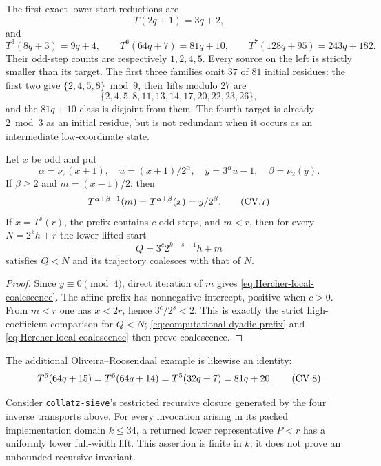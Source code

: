 The first exact lower-start reductions are
\[
 T(2q+1)=3q+2,
\]
and
\begin{equation}
\label{eq:computational-four-transports}
 T^3(8q+3)=9q+4,\qquad
 T^6(64q+7)=81q+10,\qquad
 T^7(128q+95)=243q+182.
\end{equation}
Their odd-step counts are respectively $1,2,4,5$.  Every source on the left
is strictly smaller than its target.  The first three families omit $37$ of
$81$ initial residues: the first two give
$\{2,4,5,8\}\bmod9$, their lifts modulo $27$ are
\[
 \{2,4,5,8,11,13,14,17,20,22,23,26\},
\]
and the $81q+10$ class is disjoint from them.  The fourth target is already
$2\bmod3$ as an initial residue, but is not redundant when it occurs as an
intermediate low-coordinate state.

\begin{proposition}
\label{prop:Hercher-computational-coalescence}
Let $x$ be odd and put
\[
 \alpha=\nu_2(x+1),\quad u=(x+1)/2^\alpha,
 \quad y=3^\alpha u-1,\quad\beta=\nu_2(y).
\]
If $\beta\geq2$ and $m=(x-1)/2$, then
\begin{equation}
\stepcounter{equation}
\label{eq:Hercher-local-coalescence}
 T^{\alpha+\beta-1}(m)=T^{\alpha+\beta}(x)=y/2^\beta.
\tag{CV.7}
\end{equation}
If $x=T^s(r)$, the prefix contains $c$ odd steps, and $m<r$, then for every
$N=2^kh+r$ the lower lifted start
\[
 Q=3^c2^{k-s-1}h+m
\]
satisfies $Q<N$ and its trajectory coalesces with that of $N$.
\end{proposition}

\begin{proof}
Since $y\equiv0\pmod4$, direct iteration of $m$ gives
\eqref{eq:Hercher-local-coalescence}.  The affine prefix has nonnegative
intercept, positive when $c>0$.  From $m<r$ one has $x<2r$, hence
$3^c/2^s<2$.  This is exactly the strict high-coefficient comparison for
$Q<N$; \eqref{eq:computational-dyadic-prefix} and
\eqref{eq:Hercher-local-coalescence} then prove coalescence.
\end{proof}

The additional Oliveira--Roosendaal example is likewise an identity:
\begin{equation}
\stepcounter{equation}
\label{eq:Oliveira-Roosendaal-coalescence}
 T^6(64q+15)=T^6(64q+14)=T^5(32q+7)=81q+20.
\tag{CV.8}
\end{equation}

\begin{theorem}
\label{thm:Barina-recursive-k34}
Consider \texttt{collatz-sieve}'s restricted recursive closure generated by
the four inverse transports above.  For every invocation arising in its
packed implementation domain $k\leq34$, a returned lower representative
$P<r$ has a uniformly lower full-width lift.  This assertion is finite in
$k$; it does not prove an unbounded recursive invariant.
\end{theorem}

